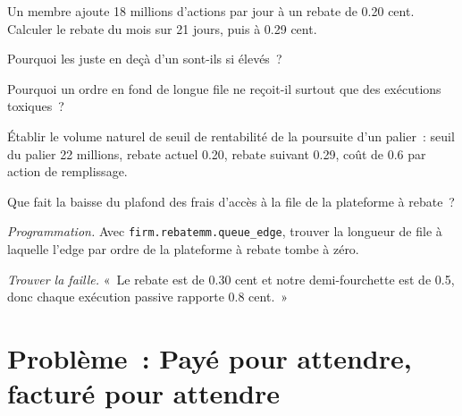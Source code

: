 \begin{exercise}[$\star$]\label{exo:hf:rebates-inverted-venues-and-tiers:2}
Un membre ajoute 18 millions d'actions par jour à un rebate de 0.20 cent. Calculer le rebate du mois sur 21 jours, puis à 0.29 cent.
\end{exercise}

\begin{exercise}[$\star$]\label{exo:hf:rebates-inverted-venues-and-tiers:3}
Pourquoi les  juste en deçà d'un  sont-ils si élevés~?
\end{exercise}

\begin{exercise}[$\star\star$]\label{exo:hf:rebates-inverted-venues-and-tiers:4}
Pourquoi un ordre en fond de longue file ne reçoit-il surtout que des exécutions toxiques~?
\end{exercise}

\begin{exercise}[$\star\star$]\label{exo:hf:rebates-inverted-venues-and-tiers:5}
Établir le volume naturel de seuil de rentabilité de la poursuite d'un palier~: seuil du palier 22 millions, rebate actuel 0.20, rebate suivant 0.29, coût de 0.6 par action de remplissage.
\end{exercise}

\begin{exercise}[$\star\star$]\label{exo:hf:rebates-inverted-venues-and-tiers:6}
Que fait la baisse du plafond des frais d'accès à la file de la plateforme à rebate~?
\end{exercise}

\begin{exercise}[$\star\star\star$]\label{exo:hf:rebates-inverted-venues-and-tiers:7}
\emph{Programmation.} Avec \texttt{firm.rebatemm.queue\_edge}, trouver la longueur de file à laquelle l'edge par ordre de la plateforme à rebate tombe à zéro.
\end{exercise}

\begin{exercise}[$\star\star\star$]\label{exo:hf:rebates-inverted-venues-and-tiers:8}
\emph{Trouver la faille.} «~Le rebate est de 0.30 cent et notre demi-fourchette est de 0.5, donc chaque exécution passive rapporte 0.8 cent.~»
\end{exercise}

\section{Problème~: Payé pour attendre, facturé pour attendre}

